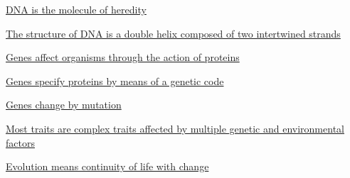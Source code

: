 \documentclass[12pt,letterpaper]{article}
\newcommand{\thetitle}{\hypertarget{home}{Essential Genetics and Genomics}}
\begin{document}
\hypertarget{1.1}{}
\begin{secbox}{\hyperlink{1}{DNA is the molecule of heredity}}{

}\end{secbox}
\hypertarget{1.2}{}
\begin{secbox}{\hyperlink{1}{The structure of DNA is a double helix composed of two intertwined strands}}{

}\end{secbox}
\hypertarget{1.3}{}
\begin{secbox}{\hyperlink{1}{Genes affect organisms through the action of proteins}}{

}\end{secbox}
\hypertarget{1.4}{}
\begin{secbox}{\hyperlink{1}{Genes specify proteins by means of a genetic code}}{

}\end{secbox}
\hypertarget{1.5}{}
\begin{secbox}{\hyperlink{1}{Genes change by mutation}}{

}\end{secbox}
\hypertarget{1.6}{}
\begin{secbox}{\hyperlink{1}{Most traits are complex traits affected by multiple genetic and environmental factors}}{

}\end{secbox}
\hypertarget{1.7}{}
\begin{secbox}{\hyperlink{1}{Evolution means continuity of life with change}}{

}\end{secbox}


\clearpage

\renewcommand{\thetitle}{\hypertarget{2}{The Genetic Code of Genes
and Genomes}}
\hypertarget{2}{} 
\end{document}
